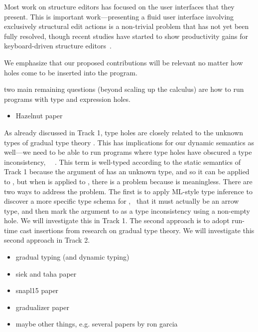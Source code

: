 Most work on structure editors has focused on the user interfaces that they
present. This is important work---presenting a fluid user interface involving
exclusively structural edit actions is a non-trivial problem that has not yet
been fully resolved, though recent studies have started to show productivity
gains for keyboard-driven structure
editors~\cite{DBLP:conf/vl/Asenov014,DBLP:conf/sle/VolterSBK14}.

We emphasize
that our proposed contributions will be relevant no matter how holes come to be
inserted into the program. %

two main remaining questions (beyond scaling up the calculus) are how to run
programs with type and expression holes.

\begin{itemize}
	\item Hazelnut paper
\end{itemize}


As already discussed in Track 1, type holes are closely related to the unknown
types of gradual type theory \cite{Siek06a}. This has implications for our
dynamic semantics as well---we need to be able to run programs where type holes
have obscured a type inconsistency, \eg{}~\ .
This term is well-typed according to the static semantics of Track 1 because the
argument  of  has an unknown type, and so it can be applied to
, but when  is applied to , there is a problem because 
is meaningless. There are two ways to address the problem. The first is to
apply ML-style type inference to discover a more specific type schema for
, \ie{}~that it must actually be an arrow type, and then mark the argument
 to  as a type inconsistency using a non-empty hole. We will
investigate this in Track 1. The second approach is to adopt run-time cast
insertions from research on gradual type theory. We will investigate this second
approach in Track 2. 

\begin{itemize}
	\item gradual typing (and dynamic typing)
  \item siek and taha paper
  \item snapl15 paper
  \item gradualizer paper
  \item maybe other things, e.g. several papers by ron garcia
\end{itemize}

